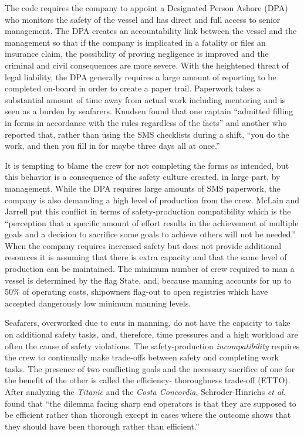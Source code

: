 \documentclass[twoside,symmetric,notoc]{tufte-book}
\newcommand{\etal}{\textit{et al.}\xspace}
\begin{document}
\par{%
The code requires the company to appoint a Designated Person Ashore (DPA) who monitors the safety of the vessel and has direct and full access to senior management. The DPA creates an accountability link between the vessel and the management so that if the company is implicated in a fatality or files an insurance claim, the possibility of proving negligence is improved and the criminal and civil consequences are more severe.\cite{Boisson} With the heightened threat of legal liability, the DPA generally requires a large amount of reporting to be completed on-board in order to create a paper trail. Paperwork takes a substantial amount of time away from actual work including mentoring and is seen as a burden by seafarers. Knudsen found that one captain ``admitted filling in forms in accordance with the rules regardless of the facts'' and another who reported that, rather than using the SMS checklists during a shift, ``you do the work, and then you fill in for maybe three days all at once.''\cite{Knudsen}
}
\par{%
It is tempting to blame the crew for not completing the forms as intended, but this behavior is a consequence of the safety culture created, in large part, by management. While the DPA requires large amounts of SMS paperwork, the company is also demanding a high level of production from the crew. McLain and Jarrell put this conflict in terms of safety-production compatibility which is the ``perception that a specific amount of effort results in the achievement of multiple goals and a decision to sacrifice some goals to achieve others will not be needed.'' When the company requires increased safety but does not provide additional resources it is assuming that there is extra capacity and that the same level of production can be maintained.\cite{McLain} The minimum number of crew required to man a vessel is determined by the flag State, and, because manning accounts for up to 50\% of operating costs, shipowners flag-out to open registries which have accepted dangerously low minimum manning levels.\cite{Balyk}
}
\par{%
Seafarers, overworked due to cuts in manning, do not have the capacity to take on additional safety tasks, and, therefore, time pressures and a high workload are often the cause of safety violations.\cite{Lawton} The safety-production \textit{incompatibility} requires the crew to continually make trade-offs between safety and completing work tasks. The presence of two conflicting goals and the necessary sacrifice of one for the benefit of the other is called the efficiency- thoroughness trade-off (ETTO).\cite{Hollnagel} After analyzing the \textit{Titanic} and the \textit{Costa Concordia}, Schroder-Hinrichs \etal found that ``the dilemma facing sharp end operators is that they are supposed to be efficient rather than thorough except in cases where the outcome shows that they should have been thorough rather than efficient.''\cite{Schroder-Hinrichs}
}
\end{document}

